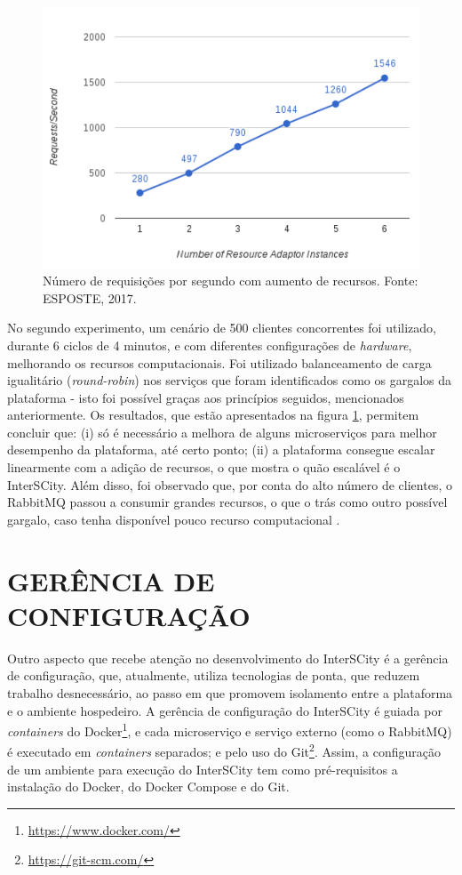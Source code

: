 \begin{figure}
  \centering
    \includegraphics[scale=0.2]{figuras/benchmark2.png}
    \caption{Número de requisições por segundo com aumento de recursos. Fonte: ESPOSTE, 2017.}
  \label{fig:benchmark2}
\end{figure}

No segundo experimento, um cenário de 500 clientes concorrentes foi utilizado, 
durante 6 ciclos de 4 minutos, e com diferentes configurações de
\textit{hardware}, melhorando os recursos computacionais. Foi utilizado
balanceamento de carga igualitário (\textit{round-robin}) nos serviços
que foram identificados como os gargalos da plataforma - isto foi possível
graças aos princípios seguidos, mencionados anteriormente. Os resultados,
que estão apresentados na figura \ref{fig:benchmark2}, permitem concluir que:
(i) só é necessário a melhora de alguns microserviços para melhor desempenho
da plataforma, até certo ponto; (ii) a plataforma consegue escalar linearmente
com a adição de recursos, o que mostra o quão escalável é o InterSCity. Além
disso, foi observado que, por conta do alto número de clientes, o RabbitMQ
passou a consumir grandes recursos, o que o trás como outro possível gargalo,
caso tenha disponível pouco recurso computacional \cite{delesposte2017}.

\section{GERÊNCIA DE CONFIGURAÇÃO}

Outro aspecto que recebe atenção no desenvolvimento do InterSCity é a gerência
de configuração, que, atualmente, utiliza tecnologias de ponta, que reduzem
trabalho desnecessário, ao passo em que promovem isolamento entre a plataforma
e o ambiente hospedeiro. A gerência de configuração do InterSCity é guiada por
\textit{containers} do Docker\footnote{\url{https://www.docker.com/}}, e cada
microserviço e serviço externo (como o RabbitMQ) é executado em
\textit{containers} separados; e pelo uso do
Git\footnote{\url{https://git-scm.com/}}. Assim, a configuração de um ambiente
para execução do InterSCity tem como pré-requisitos a instalação do Docker, do
Docker Compose e do Git.

